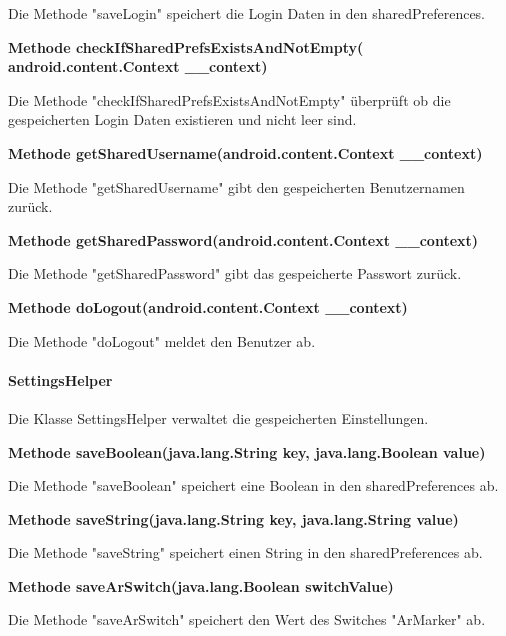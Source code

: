 \documentclass{scrartcl}
\begin{document}
\noindent Die Methode "saveLogin" speichert die Login Daten in den sharedPreferences. \newline 

\noindent\textbf{Methode checkIfSharedPrefsExistsAndNotEmpty( \newline android.content.Context \_\_context)}

\noindent Die Methode "checkIfSharedPrefsExistsAndNotEmpty" überprüft ob die gespeicherten Login Daten existieren und nicht leer sind. \newline 

\noindent\textbf{Methode getSharedUsername(android.content.Context \_\_context)}

\noindent Die Methode "getSharedUsername" gibt den gespeicherten Benutzernamen zurück. \newline 

\noindent\textbf{Methode getSharedPassword(android.content.Context \_\_context)}

\noindent Die Methode "getSharedPassword" gibt das gespeicherte Passwort zurück. \newline 

\noindent\textbf{Methode doLogout(android.content.Context \_\_context)}

\noindent Die Methode "doLogout" meldet den Benutzer ab. \newline

\paragraph{SettingsHelper}
Die Klasse SettingsHelper verwaltet die gespeicherten Einstellungen. \newline 

\noindent\textbf{Methode saveBoolean(java.lang.String key,                     java.lang.Boolean value)}

\noindent Die Methode "saveBoolean" speichert eine Boolean in den sharedPreferences ab. \newline 

\noindent\textbf{Methode saveString(java.lang.String key, java.lang.String value)}

\noindent Die Methode "saveString" speichert einen String in den sharedPreferences ab. \newline 

\noindent\textbf{Methode saveArSwitch(java.lang.Boolean switchValue)}

\noindent Die Methode "saveArSwitch" speichert den Wert des Switches "ArMarker" ab. \newline
\end{document}

